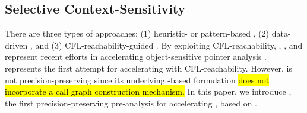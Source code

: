 
\subsection{Selective Context-Sensitivity} 

There are three types of approaches: (1) heuristic- or pattern-based \cite{
hassanshahi2017efficient, li2018precision, li2020principled}, (2) data-driven  \cite{jeong2017data, jeon2018precise}, and (3) CFL-reachability-guided  \cite{lu2019precision, lu2021eagle, lu2021selective, He2021Turner, he2022selecting}. 
By exploiting CFL-reachability, \eagle \cite{lu2019precision, lu2021eagle}, \turner \cite{He2021Turner, he2022selecting}, and \conch \cite{HeASE21, he2023ifds} represent recent efforts in accelerating object-sensitive pointer analysis \cite{milanova2002parameterized, milanova2005parameterized}. \selectx \cite{lu2021selective} represents the first attempt for accelerating  with CFL-reachability. However, 
\selectx is not precision-preserving since its underlying
\manuLFC-based formulation \cite{sridharan2006refinement} \hl{does not incorporate a call graph construction mechanism.} %
In this paper, 
we introduce \tool, the first precision-preserving pre-analysis for accelerating
,  based on \LFCR.
 




